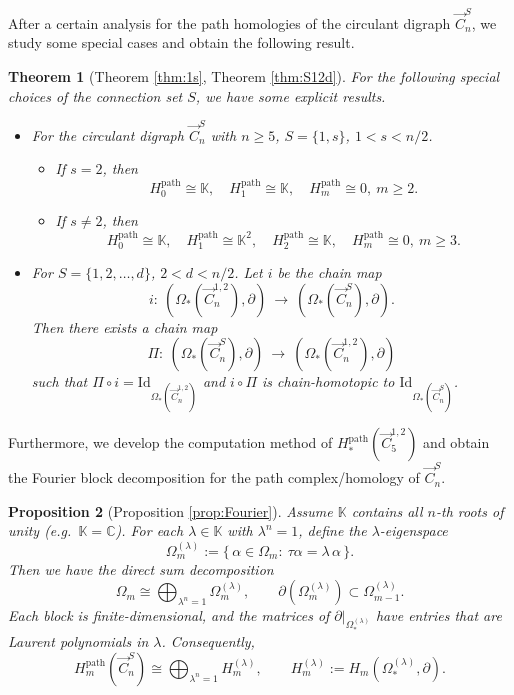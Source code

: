 \documentclass[11pt]{amsart}
\newcommand{\K}{\mathbb K}
\theoremstyle{plain}
\newtheorem{theorem}{Theorem}[section]
\newtheorem{proposition}[theorem]{Proposition}
\theoremstyle{definition}
\numberwithin{equation}{section}
\begin{document}
After a certain analysis for the path homologies of the circulant digraph $\vec{C}_n^S$, we study some special cases and obtain the following result.

\begin{theorem}[Theorem \ref{thm:1s}, Theorem \ref{thm:S12d}]
For the following special choices of the connection set $S$, we have some explicit results.
\begin{itemize}
    \item[(1)] For the circulant digraph $\vec{C}_n^S$ with $n\ge5$, $S=\{1,s\}$, $1<s<n/2$. 
\begin{itemize}
    \item If $s=2$, then
    \[H_0^{\mathrm{path}}\cong\K,\quad H_1^{\mathrm{path}}\cong\K,\quad H_m^{\mathrm{path}}\cong0,~m\geq2.\]
    \item If $s\neq2$, then
    \[H_0^{\mathrm{path}}\cong\K,\quad H_1^{\mathrm{path}}\cong\K^2,\quad H_2^{\mathrm{path}}\cong\K,\quad H_m^{\mathrm{path}}\cong0,~m\geq3.\]
\end{itemize}   
   \item[(2)] For $S=\{1,2,\ldots,d\}$, $2<d<n/2$. Let $i$ be the chain map
   \[i:\ \left(\Omega_*(\vec{C}_n^{1,2}),\partial\right)\ \to\ \left(\Omega_*(\vec{C}_n^S),\partial\right).\]
Then there exists a chain map
\[
\Pi:\ \left(\Omega_*(\vec{C}_n^S),\partial\right)~\rightarrow~ \left(\Omega_*(\vec{C}_n^{1,2}),\partial\right)
\]
such that $\Pi\circ i=\mathrm{Id}_{\Omega_*(\vec{C}_n^{1,2})}$ and $i\circ\Pi$ is chain-homotopic to $\mathrm{Id}_{\Omega_*(\vec{C}_n^S)}$.
\end{itemize}
\end{theorem}

Furthermore, we develop the computation method of $H_*^{\mathrm{path}}(\vec{C}_5^{1,2})$ and obtain the Fourier block decomposition for the path complex/homology of $\vec{C}_n^S$.

\begin{proposition}[Proposition \ref{prop:Fourier}]
Assume $\K$ contains all $n$-th roots of unity (e.g.\ $\K=\mathbb C$). For each $\lambda\in\K$ with $\lambda^n=1$, define the
$\lambda$-eigenspace
\[
\Omega_m^{(\lambda)}:=\{\,\alpha\in \Omega_m:\ \tau\alpha=\lambda\,\alpha\,\}.
\]
Then we have the direct sum decomposition
\begin{equation}\label{eq:fourier-split}
\Omega_m \cong \bigoplus_{\lambda^n=1} \Omega_m^{(\lambda)},\qquad
\partial(\Omega_m^{(\lambda)})\subset \Omega_{m-1}^{(\lambda)}.
\end{equation}
Each block is finite-dimensional, and the matrices of $\partial\big|_{\Omega_{*}^{(\lambda)}}$ have entries that are Laurent polynomials in $\lambda$. Consequently,
\begin{equation}\label{eq:homology-split}
H_m^{\mathrm{path}}(\vec{C}_n^S) \cong \bigoplus_{\lambda^n=1} H_m^{(\lambda)},\qquad
H_m^{(\lambda)}:=H_m(\Omega_*^{(\lambda)},\partial).
\end{equation}
\end{proposition}
\end{document}
